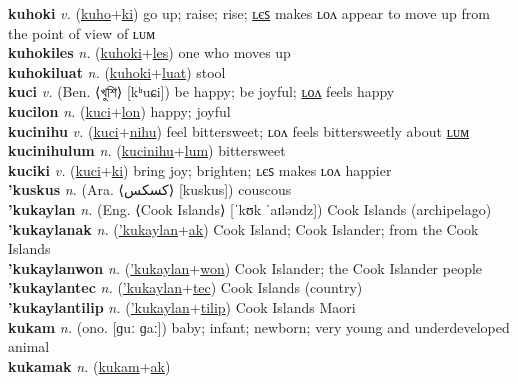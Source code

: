 \textbf{kuhoki} \textit{v.} (\hyperref[kuho]{kuho}+\hyperref[ki]{ki})
go up; raise; rise; \hyperref[kuhokiles]{ʟєꜱ} makes ʟᴏᴧ appear to move up from the point of view of ʟᴜᴍ \label{kuhoki} \\
\textbf{kuhokiles} \textit{n.} (\hyperref[kuhoki]{kuhoki}+\hyperref[les]{les})
one who moves up \label{kuhokiles} \\
\textbf{kuhokiluat} \textit{n.} (\hyperref[kuhoki]{kuhoki}+\hyperref[luat]{luat})
stool \label{kuhokiluat} \\
\textbf{kuci} \textit{v.} (Ben. ⟨খুশি⟩ [kʰuɕi])
be happy; be joyful; \hyperref[kucilon]{ʟᴏᴧ} feels happy \label{kuci} \\
\textbf{kucilon} \textit{n.} (\hyperref[kuci]{kuci}+\hyperref[lon]{lon})
happy; joyful \label{kucilon} \\
\textbf{kucinihu} \textit{v.} (\hyperref[kuci]{kuci}+\hyperref[nihu]{nihu})
feel bittersweet; ʟᴏᴧ feels bittersweetly about \hyperref[kucinihulum]{ʟᴜᴍ} \label{kucinihu} \\
\textbf{kucinihulum} \textit{n.} (\hyperref[kucinihu]{kucinihu}+\hyperref[lum]{lum})
bittersweet \label{kucinihulum} \\
\textbf{kuciki} \textit{v.} (\hyperref[kuci]{kuci}+\hyperref[ki]{ki})
bring joy; brighten; ʟєꜱ makes ʟᴏᴧ happier \label{kuciki} \\
\textbf{'kuskus} \textit{n.} (Ara. ⟨كسكس⟩ [kuskus])
couscous \label{'kuskus} \\
\textbf{'kukaylan} \textit{n.} (Eng. ⟨Cook Islands⟩ [ˈkʊk ˈaɪləndz])
Cook Islands (archipelago) \label{'kukaylan} \\
\textbf{'kukaylanak} \textit{n.} (\hyperref['kukaylan]{'kukaylan}+\hyperref[ak]{ak})
Cook Island; Cook Islander; from the Cook Islands \label{'kukaylanak} \\
\textbf{'kukaylanwon} \textit{n.} (\hyperref['kukaylan]{'kukaylan}+\hyperref[won]{won})
Cook Islander; the Cook Islander people \label{'kukaylanwon} \\
\textbf{'kukaylantec} \textit{n.} (\hyperref['kukaylan]{'kukaylan}+\hyperref[tec]{tec})
Cook Islands (country) \label{'kukaylantec} \\
\textbf{'kukaylantilip} \textit{n.} (\hyperref['kukaylan]{'kukaylan}+\hyperref[tilip]{tilip})
Cook Islands Maori \label{'kukaylantilip} \\
\textbf{kukam} \textit{n.} (ono. [ɡuː ɡaː])
baby; infant; newborn; very young and underdeveloped animal \label{kukam} \\
\textbf{kukamak} \textit{n.} (\hyperref[kukam]{kukam}+\hyperref[ak]{ak})
